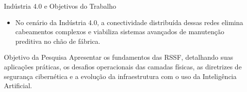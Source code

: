 \begin{frame}{Indústria 4.0 e Objetivos do Trabalho}
    \begin{itemize}
        \item No cenário da Indústria 4.0, a conectividade distribuída dessas redes elimina cabeamentos complexos e viabiliza sistemas avançados de manutenção preditiva no chão de fábrica.   
    \end{itemize}
    
    \vspace{0.5cm}
    
    \begin{block}{Objetivo da Pesquisa}
        Apresentar os fundamentos das RSSF, detalhando suas aplicações práticas, os desafios operacionais das camadas físicas, as diretrizes de segurança cibernética e a evolução da infraestrutura com o uso da Inteligência Artificial.   
    \end{block}
\end{frame}